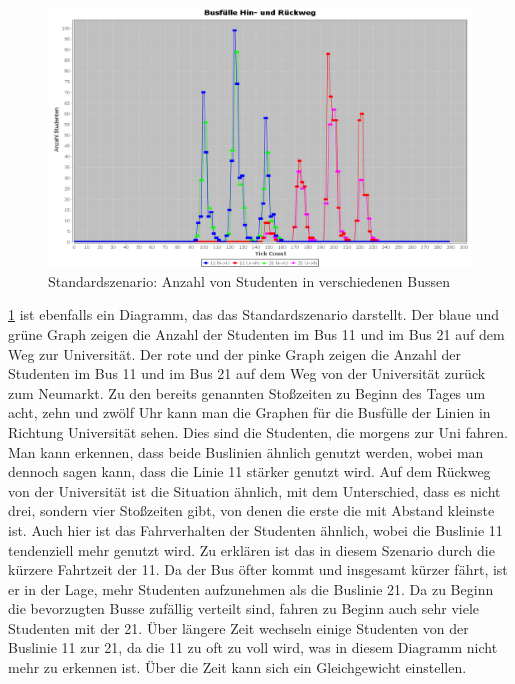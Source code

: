 \documentclass[12pt,a4paper]{scrartcl}
\begin{document}
\begin{figure}
\includegraphics[scale=0.4]{Standardszenario_Busse.png}
\caption{Standardszenario: Anzahl von Studenten in verschiedenen Bussen}
\label{s1g2}
\end{figure}

\ref{s1g2} ist ebenfalls ein Diagramm, das das Standardszenario darstellt. Der blaue und grüne Graph zeigen die Anzahl der Studenten im Bus 11 und im Bus 21 auf dem Weg zur Universität. Der rote und der pinke Graph zeigen die Anzahl der Studenten im Bus 11 und im Bus 21 auf dem Weg von der Universität zurück zum Neumarkt. Zu den bereits genannten Stoßzeiten zu Beginn des Tages um acht, zehn und zwölf Uhr kann man die Graphen für die Busfülle der Linien in Richtung Universität sehen. Dies sind die Studenten, die morgens zur Uni fahren. Man kann erkennen, dass beide Buslinien ähnlich genutzt werden, wobei man dennoch sagen kann, dass die Linie 11 stärker genutzt wird. 
Auf dem Rückweg von der Universität ist die Situation ähnlich, mit dem Unterschied, dass es nicht drei, sondern vier Stoßzeiten gibt, von denen die erste die mit Abstand kleinste ist. Auch hier ist das Fahrverhalten der Studenten ähnlich, wobei die Buslinie 11 tendenziell mehr genutzt wird. 
Zu erklären ist das in diesem Szenario durch die kürzere Fahrtzeit der 11. Da der Bus öfter kommt und insgesamt kürzer fährt, ist er in der Lage, mehr Studenten aufzunehmen als die Buslinie 21. Da zu Beginn die bevorzugten Busse zufällig verteilt sind, fahren zu Beginn auch sehr viele Studenten mit der 21. Über längere Zeit wechseln einige Studenten von der Buslinie 11 zur 21, da die 11 zu oft zu voll wird, was in diesem Diagramm nicht mehr zu erkennen ist. Über die Zeit kann sich ein Gleichgewicht einstellen.
\end{document}
